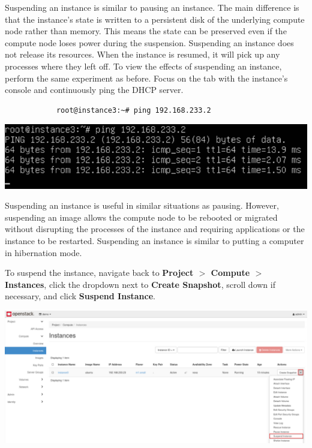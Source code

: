 \documentclass[letterpaper, 12pt]{article}
\begin{document}
\begin{enumerate}
    \begin{labstep}
        Suspending an instance is similar to pausing an instance.
        The main difference is that the instance's state is written to a persistent disk of the underlying compute node rather than memory.
        This means the state can be preserved even if the compute node loses power during the suspension.
        Suspending an instance does not release its resources.
        When the instance is resumed, it will pick up any processes where they left off.
        To view the effects of suspending an instance, perform the same experiment as before.
        Focus on the tab with the instance's console and continuously ping the DHCP server.
        \begin{lstlisting}
            root@instance3:~# ping 192.168.233.2
        \end{lstlisting}

        \begin{center}
            \includegraphics[width=\linewidth]{images/part3/step12.png}
        \end{center}
    \end{labstep}

    \begin{tipbox}
        Suspending an instance is useful in similar situations as pausing.
        However, suspending an image allows the compute node to be rebooted or migrated without disrupting the processes of the instance and requiring applications or the instance to be restarted.
        Suspending an instance is similar to putting a computer in hibernation mode.
    \end{tipbox}

    \begin{labstep}
        To suspend the instance, navigate back to \textbf{Project $>$ Compute $>$ Instances}, click the dropdown next to \textbf{Create Snapshot}, scroll down if necessary, and click \textbf{Suspend Instance}.

        \begin{center}
            \includegraphics[width=\linewidth]{images/part3/step13.png}
        \end{center}
    \end{labstep}


\end{enumerate}
\end{document}
